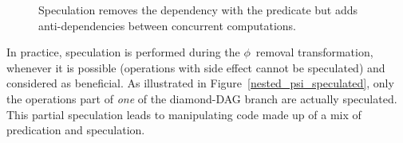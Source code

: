 \begin{figure}[h]
\hfill
{}\hfill
{}\hfill
{}
\caption{\label{fig:pred_versus_spec}Speculation removes the dependency with the predicate but adds anti-dependencies between concurrent computations.}
\end{figure}

In practice, speculation is performed during the $\phi$~removal transformation, whenever it is possible (operations with side effect cannot be speculated) and considered as beneficial. 
As illustrated in Figure~\ref{nested_psi_speculated}, only the operations part of \emph{one} of the diamond-DAG branch are actually speculated. 
This partial speculation leads to manipulating code made up of a mix of predication and speculation.


